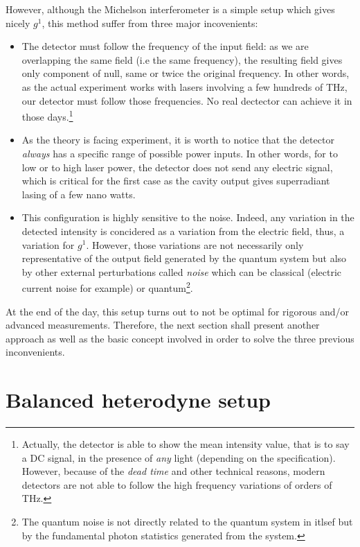 \documentclass[12pt]{report}
\begin{document}
However, although the Michelson interferometer is a simple setup which gives nicely $g^1$, this method suffer from three major incovenients:
\begin{itemize}
	\item The detector must follow the frequency of the input field: as we are overlapping the same field (i.e the same frequency), the resulting field gives only component of null, same or twice the original frequency. In other words, as the actual experiment works with lasers involving a few hundreds of THz, our detector must follow those frequencies. No real dectector can achieve it in those days.\footnote{Actually, the detector is able to show the mean intensity value, that is to say a DC signal, in the presence of \textit{any} light (depending on the specification). However, because of the \textit{dead time} and other technical reasons, modern detectors are not able to follow the high frequency variations of orders of THz.}
	\item As the theory is facing experiment, it is worth to notice that the detector \textit{always} has a specific range of possible power inputs. In other words, for to low or to high laser power, the detector does not send any electric signal, which is critical for the first case as the cavity output gives superradiant lasing of a few nano watts.
	\item This configuration is highly sensitive to the noise. Indeed, any variation in the detected intensity is concidered as a variation from the electric field, thus, a variation for $g^1$. However, those variations are not necessarily only representative of the output field generated by the quantum system but also by other external perturbations called \textit{noise} which can be classical (electric current noise for example) or quantum\footnote{The quantum noise is not directly related to the quantum system in itlsef but by the fundamental photon statistics generated from the system.}.
\end{itemize}

At the end of the day, this setup turns out to not be optimal for rigorous and/or advanced measurements. Therefore, the next section shall present another approach as well as the basic concept involved in order to solve the three previous inconvenients.

\section{Balanced heterodyne setup}
\paragraph{}
\end{document}
